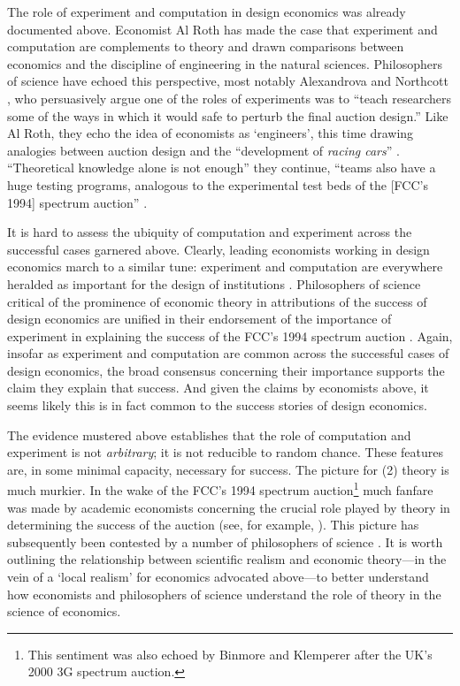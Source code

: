 The role of experiment and computation in design economics was already documented above. Economist Al Roth \autocite*{roth2002, roth2018} has made the case that experiment and computation are complements to theory and drawn comparisons between economics and the discipline of engineering in the natural sciences. Philosophers of science have echoed this perspective, most notably Alexandrova and Northcott \autocite*[320]{alexandrova2009}, who persuasively argue one of the roles of experiments was to ``teach researchers some of the ways in which it would safe to perturb the final auction design.'' Like Al Roth, they echo the idea of economists as `engineers', this time drawing analogies between auction design and the ``development of \textit{racing cars}'' \autocite[331, emphasis original]{alexandrova2009}. ``Theoretical knowledge alone is not enough'' they continue, ``teams also have a huge testing programs, analogous to the experimental test beds of the [FCC's 1994] spectrum auction'' \autocite[331]{alexandrova2009}. 

It is hard to assess the ubiquity of computation and experiment across the successful cases garnered above. Clearly, leading economists working in design economics march to a similar tune: experiment and computation are everywhere heralded as important for the design of institutions \autocite{roth2002,binmore2002,sönmez2023minimalist,milgrom2004}. Philosophers of science critical of the prominence of economic theory in attributions of the success of design economics are unified in their endorsement of the importance of experiment in explaining the success of the FCC's 1994 spectrum auction \autocite{alexandrova2009,nikkhah2008}. Again, insofar as experiment and computation are common across the successful cases of design economics, the broad consensus concerning their importance supports the claim they explain that success. And given the claims by economists above, it seems likely this is in fact common to the success stories of design economics.

The evidence mustered above establishes that the role of computation and experiment is not \textit{arbitrary}; it is not reducible to random chance. These features are, in some minimal capacity, necessary for success. The picture for (2) theory is much murkier. In the wake of the FCC's 1994 spectrum auction\footnote{This sentiment was also echoed by Binmore and Klemperer \autocite*{binmore2002} after the UK's 2000 3G spectrum auction.} much fanfare was made by academic economists concerning the crucial role played by theory in determining the success of the auction (see, for example, \cite{mcafee1996,mcmillan1994}). This picture has subsequently been contested by a number of philosophers of science \autocite{nikkhah2008,alexandrova2009}. It is worth outlining the relationship between scientific realism and economic theory---in the vein of a `local realism' for economics \autocite{maki2009} advocated above---to better understand how economists and philosophers of science understand the role of theory in the science of economics.

